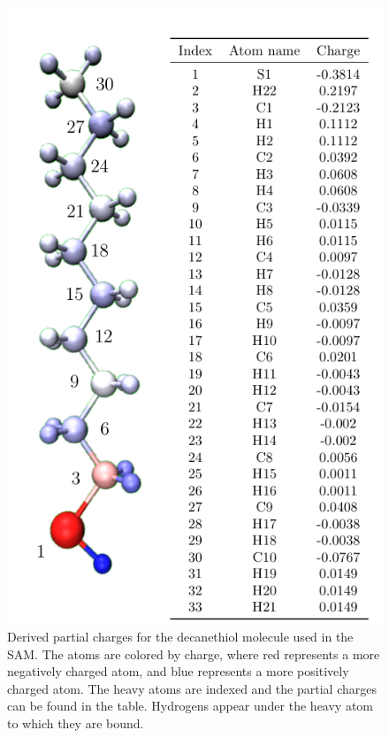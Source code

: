 \begin{figure}
    \center
    \includegraphics[width=\single]{figures-helix/charge_figure.png}
    \caption{
        Derived partial charges for the decanethiol molecule used in the SAM. 
        The atoms are colored by charge, where red represents a more negatively charged atom, and blue represents a more positively charged atom. 
        The heavy atoms are indexed and the partial charges can be found in the table. 
        Hydrogens appear under the heavy atom to which they are bound.
    }
    \label{fig:helix-charges}
\end{figure}

